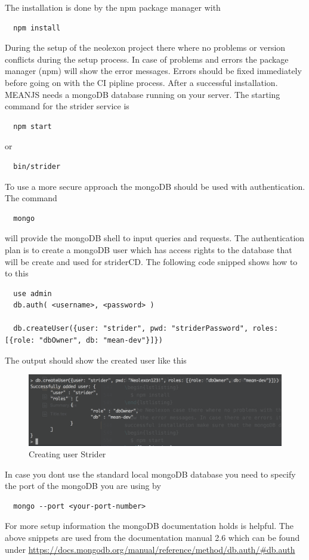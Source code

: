 The installation is done by the npm package manager with
\begin{lstlisting}
  npm install
\end{lstlisting}

During the setup of the neolexon project there where no problems or version conflicts during the setup process. In case of problems and errors
the package manager (npm) will show the error messages. Errors should be fixed immediately before going on with the CI pipline process. After a
successful installation. MEANJS needs a mongoDB database running on your server. The starting command for the strider service is
\begin{lstlisting}
  npm start
\end{lstlisting}
or
\begin{lstlisting}
  bin/strider
\end{lstlisting}
To use a more secure approach the mongoDB should be used with authentication. The command
\begin{lstlisting}
  mongo
\end{lstlisting}
will provide the mongoDB shell to input queries and requests. The authentication plan is to create a mongoDB user which has access
rights to the database that will be create and used for striderCD. The following code snipped shows how to to this
\begin{lstlisting}
  use admin
  db.auth( <username>, <password> )

  db.createUser({user: "strider", pwd: "striderPassword", roles: [{role: "dbOwner", db: "mean-dev"}]})
\end{lstlisting}
The output should show the created user like this
\begin{figure}[h!]
  \centering
  \includegraphics[width=1\textwidth]{images/createUser.png}
  \caption{Creating user Strider}
\end{figure}
In case you dont use the standard local mongoDB database you need to specify the port of the mongoDB you are using by
\begin{lstlisting}
  mongo --port <your-port-number>
\end{lstlisting}
For more setup information the mongoDB documentation holds is helpful. The above snippets are
used from the documentation manual 2.6 which can be found under \url{https://docs.mongodb.org/manual/reference/method/db.auth/#db.auth}

